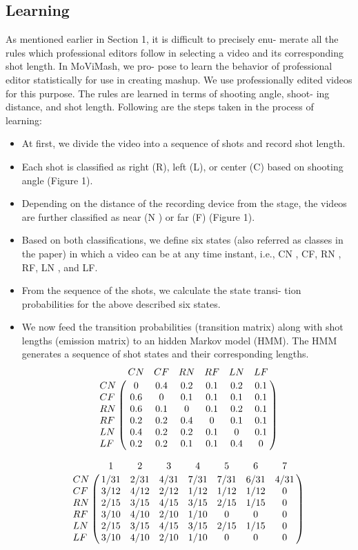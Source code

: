 \documentclass{sig-alternate}
\begin{document}
\subsection{Learning}
As mentioned earlier in Section 1, it is difficult to precisely enu-
merate all the rules which professional editors follow in selecting
a video and its corresponding shot length. In MoViMash, we pro-
pose to learn the behavior of professional editor statistically for use
in creating mashup. We use professionally edited videos for this
purpose. The rules are learned in terms of shooting angle, shoot-
ing distance, and shot length. Following are the steps taken in the
process of learning:
\begin{itemize}
    \item At first, we divide the video into a sequence of shots and
record shot length.
    \item Each shot is classified as right (R), left (L), or center (C)
based on shooting angle (Figure 1).
    \item Depending on the distance of the recording device from the
stage, the videos are further classified as near (N ) or far (F)
(Figure 1).
    \item Based on both classifications, we define six states (also referred as classes in the paper) in which a video can be at any
time instant, i.e., CN , CF, RN , RF, LN , and LF.
    \item From the sequence of the shots, we calculate the state transi-
tion probabilities for the above described six states.
    \item We now feed the transition probabilities (transition matrix)
along with shot lengths (emission matrix) to an hidden Markov
model (HMM). The HMM generates a sequence of shot states
and their corresponding lengths.
\begin{equation}
\bordermatrix{~ & CN & CF & RN & RF & LN & LF \cr
 CN  &  0 & 0.4 & 0.2 & 0.1 & 0.2 & 0.1 \cr
 CF & 0.6 & 0 & 0.1 & 0.1 & 0.1 & 0.1\cr
 RN & 0.6 & 0.1 & 0 & 0.1 & 0.2 & 0.1\cr
 RF & 0.2 & 0.2 & 0.4 & 0 & 0.1 & 0.1\cr
 LN & 0.4 & 0.2 & 0.2 & 0.1 & 0 & 0.1\cr
 LF & 0.2 & 0.2 & 0.1 & 0.1 & 0.4 & 0\cr
}
\end{equation}

\begin{equation}
\bordermatrix{~ & 1 & 2 & 3 & 4 & 5 & 6 & 7 \cr
 CN  &  1/31 & 2/31 & 4/31 & 7/31 & 7/31 & 6/31 & 4/31 \cr
 CF & 3/12 & 4/12 & 2/12 & 1/12 & 1/12 & 1/12 & 0\cr
 RN & 2/15 & 3/15 & 4/15 & 3/15 & 2/15 & 1/15 & 0\cr
 RF & 3/10 & 4/10 & 2/10 & 1/10 & 0 & 0 & 0\cr
 LN & 2/15 & 3/15 & 4/15 & 3/15 & 2/15 & 1/15 & 0\cr
 LF & 3/10 & 4/10 & 2/10 & 1/10 & 0 & 0 & 0\cr
}
\end{equation}
\end{itemize}
\end{document}
